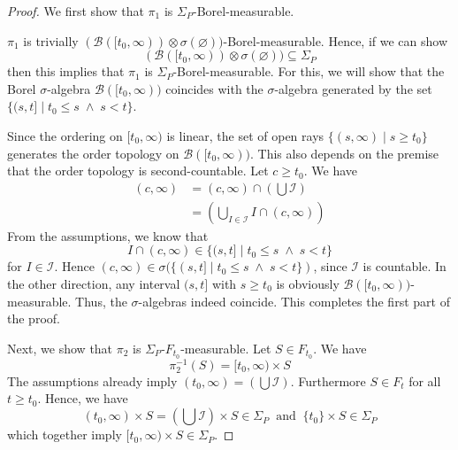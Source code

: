 \begin{proof}
	We first show that $\pi_1$ is $\Sigma_P$-Borel-measurable.
	
	$\pi_1$ is trivially $(\mathcal{B}([t_0,\infty)) \otimes \sigma(\varnothing))$-Borel-measurable. Hence, if we can show 
	\[
		(\mathcal{B}([t_0,\infty)) \otimes \sigma(\varnothing)) \subseteq \Sigma_P
	\]
	then this implies that $\pi_1$ is $\Sigma_P$-Borel-measurable. For this, we will show that the Borel $\sigma$-algebra $\mathcal{B}([t_0,\infty))$ coincides with the $\sigma$-algebra generated by the set $\{(s,t] \;\vert\; t_0 \le s \;\wedge\; s < t\}$.
	
	Since the ordering on $[t_0, \infty)$ is linear, the set of open rays $\{(s,\infty) \;\vert\; s \ge t_0\}$ generates the order topology on $\mathcal{B}([t_0,\infty))$. This also depends on the premise that the order topology is second-countable. Let $c \ge t_0$. We have
	\begin{align*}
		(c, \infty) &= (c, \infty) \cap (\bigcup \mathcal{I}) \\
		&= (\bigcup_{I \in \mathcal{I}} I \cap (c, \infty))
	\end{align*}
	From the assumptions, we know that 
	\[
		I \cap (c, \infty) \in \{(s, t] \;\vert\; t_0 \le s \;\wedge\; s < t\}
	\]
	for $I \in \mathcal{I}$. Hence $(c, \infty) \in \sigma(\{(s,t] \;\vert\; t_0 \le s \;\wedge\; s < t\})$, since $\mathcal{I}$ is countable.
	In the other direction, any interval $(s,t]$ with $s \ge t_0$ is obviously $\mathcal{B}([t_0,\infty))$-measurable. Thus, the $\sigma$-algebras indeed coincide. This completes the first part of the proof.
	
	Next, we show that $\pi_2$ is $\Sigma_P$-$F_{t_0}$-measurable.
	Let $S \in F_{t_0}$. We have
	\[
		\pi_2^{-1}(S) = [t_0, \infty) \times S
	\]
	The assumptions already imply $(t_0, \infty) = (\bigcup \mathcal{I})$. Furthermore $S \in F_t$ for all $t \ge t_0$. Hence, we have
	\[
		(t_0, \infty) \times S = (\bigcup \mathcal{I}) \times S \in \Sigma_P \;\;\textrm{and}\;\; \{t_0\} \times S \in \Sigma_P
	\]
	which together imply $[t_0, \infty) \times S \in \Sigma_P$.
\end{proof}

